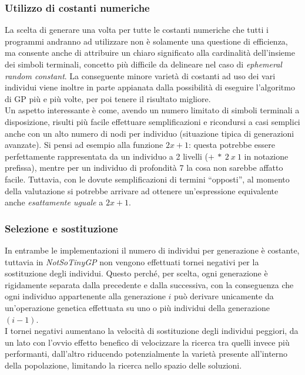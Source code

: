 \documentclass{../llncs}
\begin{document}
\subsubsection{Utilizzo di costanti numeriche}
La scelta di generare una volta per tutte le costanti numeriche che tutti i programmi andranno ad utilizzare non è solamente una questione di efficienza, ma consente anche di attribuire un chiaro significato alla cardinalità dell'insieme dei simboli terminali, concetto più difficile da delineare nel caso di \emph{ephemeral random constant}.
La conseguente minore varietà di costanti ad uso dei vari individui viene inoltre in parte appianata dalla possibilità di eseguire l'algoritmo di GP più e più volte, per poi tenere il risultato migliore.\\

Un aspetto interessante è come, avendo un numero limitato di simboli terminali a disposizione, risulti più facile effettuare semplificazioni e ricondursi a casi semplici anche con un alto numero di nodi per individuo (situazione tipica di generazioni avanzate).
Si pensi ad esempio alla funzione $2x+1$: questa potrebbe essere perfettamente rappresentata da un individuo a 2 livelli ($+\:*\:2\:x\:1$ in notazione prefissa), mentre per un individuo di profondità 7 la cosa non sarebbe affatto facile. Tuttavia, con le dovute semplificazioni di termini ``opposti'', al momento della valutazione si potrebbe arrivare ad ottenere un'espressione equivalente anche \emph{esattamente uguale} a $2x+1$.

\subsubsection{Selezione e sostituzione}
In entrambe le implementazioni il numero di individui per generazione è costante, tuttavia in \emph{NotSoTinyGP} non vengono effettuati tornei negativi per la sostituzione degli individui. Questo perché, per scelta, ogni generazione è rigidamente separata dalla precedente e dalla successiva, con la conseguenza che ogni individuo appartenente alla generazione $i$ può derivare unicamente da un'operazione genetica effettuata su uno o più individui della generazione $(i-1)$.\\

I tornei negativi aumentano la velocità di sostituzione degli individui peggiori, da un lato con l'ovvio effetto benefico di velocizzare la ricerca tra quelli invece più performanti, dall'altro riducendo potenzialmente la varietà presente all'interno della popolazione, limitando la ricerca nello spazio delle soluzioni.
\end{document}
